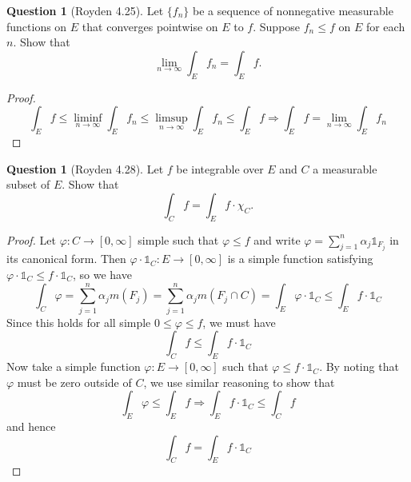 \documentclass{article}
\newcommand{\longimplies}{\Longrightarrow}
\theoremstyle{definition} %
\numberwithin{thm}{section} %
\theoremstyle{definition} %
\newtheorem{question}[thm]{Question}
\begin{document}
\begin{question}[Royden 4.25]
Let $\{f_n\}$ be a sequence of nonnegative measurable functions on $E$ that converges pointwise on $E$ to $f$. Suppose $f_n \leq f$ on $E$ for each $n$. Show that 
\[
\lim_{n \to \infty} \int_E f_n = \int_E f.
\]
\end{question}
\begin{proof}
\[ \int_E f \leq \liminf_{n \to \infty} \int_E f_n \leq \limsup_{n \to \infty} \int_E f_n \leq \int_E f \longimplies \int_E f = \lim_{n \to \infty} \int_E f_n \]
\end{proof}

\begin{question}[Royden 4.28]
Let $f$ be integrable over $E$ and $C$ a measurable subset of $E$. Show that 
\[
\int_C f = \int_E f \cdot \chi_C.
\]
\end{question}
\begin{proof}
Let $\varphi: C \to [0, \infty]$ simple such that $\varphi \leq f$ and write $\varphi = \sum_{j = 1}^n \alpha_j\mathds{1}_{F_j}$ in its canonical form. Then $\varphi \cdot \mathds{1}_C: E \to [0, \infty]$ is a simple function satisfying $\varphi \cdot \mathds{1}_C \leq f \cdot \mathds{1}_C$, so we have 
\[ \int_C \varphi = \sum_{j = 1}^n \alpha_j m(F_j) = \sum_{j = 1}^n \alpha_j m(F_j \cap C) = \int_E \varphi \cdot \mathds{1}_C \leq \int_E f \cdot \mathds{1}_C \]
Since this holds for all simple $0 \leq \varphi \leq f$, we must have 
\[ \int_C f \leq \int_E f \cdot \mathds{1}_C \]
Now take a simple function $\varphi: E \to [0,\infty]$ such that $\varphi \leq f \cdot \mathds{1}_C$. By noting that $\varphi$ must be zero outside of $C$, we use similar reasoning to show that 
\[ \int_E \varphi \leq \int_E f \longimplies \int_E f \cdot \mathds{1}_C \leq \int_C f \]
and hence \[ \int_C f = \int_E f \cdot \mathds{1}_C \]
\end{proof}
    
\end{document}
